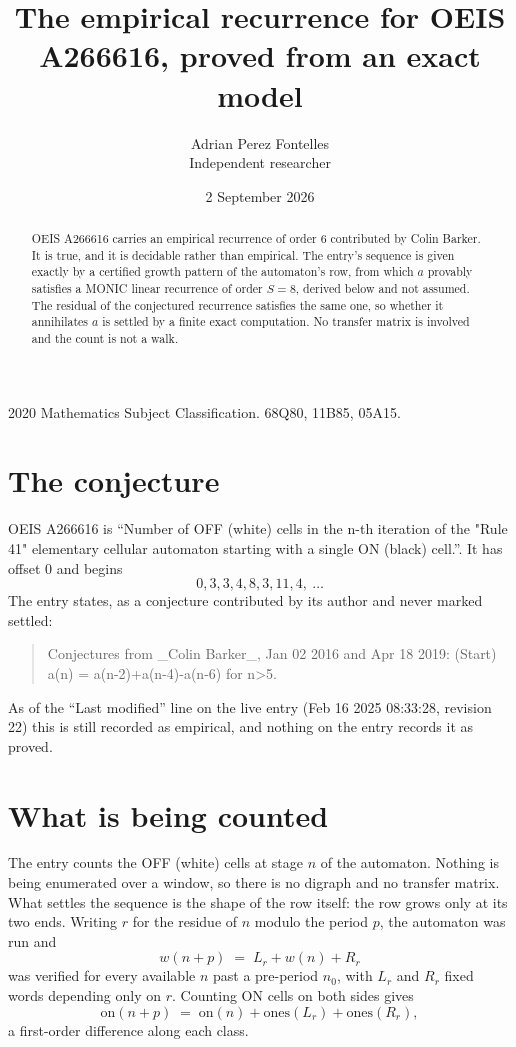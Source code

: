 \documentclass[11pt,a4paper]{article}
\title{The empirical recurrence for OEIS A266616, proved from an exact model}
\author{Adrian Perez Fontelles\\ \small Independent researcher}
\date{2 September 2026}
\theoremstyle{plain}
\theoremstyle{definition}
\begin{document}
\maketitle

\begin{abstract}
OEIS A266616 carries an empirical recurrence of order $6$ contributed by Colin Barker. It is true, and it is
decidable rather than empirical. The entry's sequence is given exactly by a certified growth pattern of the automaton's row, from
which $a$ provably satisfies a MONIC linear recurrence of order $S=8$, derived below and not
assumed. The residual of the conjectured recurrence satisfies the same one, so whether it
annihilates $a$ is settled by a finite exact computation. No transfer matrix is involved and
the count is not a walk.
\end{abstract}

\noindent\small 2020 Mathematics Subject Classification. 68Q80, 11B85, 05A15.\normalsize

\section{The conjecture}

OEIS A266616 is ``Number of OFF (white) cells in the n-th iteration of the "Rule 41" elementary cellular automaton starting with a single ON (black) cell.''. It has offset $0$ and begins
\[
0, 3, 3, 4, 8, 3, 11, 4,\ \dots
\]
The entry states, as a conjecture contributed by its author and never marked settled:
\begin{quote}
Conjectures from \_Colin Barker\_, Jan 02 2016 and Apr 18 2019: (Start) a(n) = a(n-2)+a(n-4)-a(n-6) for n>5.
\end{quote}
As of the ``Last modified'' line on the live entry (Feb 16 2025 08:33:28, revision 22)
this is still recorded as empirical, and nothing on the entry records it as proved.

\section{What is being counted}

The entry counts the OFF (white) cells at stage $n$ of the automaton. Nothing is being enumerated over a window, so there is
no digraph and no transfer matrix. What settles the sequence is the shape of the row itself:
the row grows only at its two ends. Writing
$r$ for the residue of $n$ modulo the period $p$, the automaton was run and
\[
w(n+p)\;=\;L_r + w(n) + R_r
\]
was verified for every available $n$ past a
pre-period $n_0$, with $L_r$ and $R_r$ fixed words depending only on $r$. Counting ON cells on
both sides gives
\[
\mathrm{on}(n+p)\;=\;\mathrm{on}(n)+\mathrm{ones}(L_r)+\mathrm{ones}(R_r),
\]
a first-order difference along each class.
\end{document}
